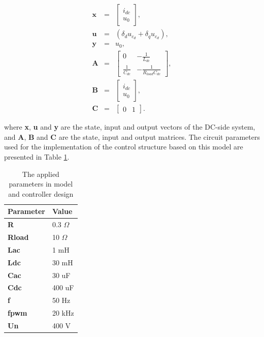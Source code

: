     \begin{equation}
        \begin{array}{rcl}
            \textbf{x}&=&\begin{bmatrix}
                i_{dc}\\
                u_0
            \end{bmatrix},\\
            \textbf{u}&=&(\delta_d u_{c_d}+\delta_q u_{c_d}),\\
            \textbf{y}&=&u_0,\\
            \textbf{A}&=&\begin{bmatrix}
                0&  -\frac{1}{L_{dc}}\\
                \frac{1}{C_{dc}}&   -\frac{1}{R_{load}C_{dc}}
            \end{bmatrix},\\
            \textbf{B}&=&\begin{bmatrix}
                i_{dc}\\
                u_0
            \end{bmatrix},\\
            \textbf{C}&=&\begin{bmatrix}0 &1\end{bmatrix}.
        \end{array}
        \label{EMPC:equ:mtx_ctrl}
    \end{equation}

    where \textbf{x}, \textbf{u} and \textbf{y} are the state, input and output vectors of the DC-side system, and \textbf{A}, \textbf{B} and \textbf{C} are the state, input and output matrices.
    The circuit parameters used for the implementation of the control structure based on this model are presented in Table \ref{EMPC:tbl:params}.

    \begin{table}[]
    \center
		\caption{The applied parameters in model and controller design}
        \begin{tabular}{|l|l|}
        \hline
        Parameter      & Value  \\ \hline
        \textbf{R}     & 0.3 $\Omega$ \\ \hline
        \textbf{Rload} & 10 $\Omega$  \\ \hline
        \textbf{Lac}   & 1 mH    \\ \hline
        \textbf{Ldc}   & 30 mH   \\ \hline
        \textbf{Cac}   & 30 uF   \\ \hline
        \textbf{Cdc}   & 400 uF  \\ \hline
        \textbf{f}     & 50 Hz   \\ \hline
        \textbf{fpwm}  & 20 kHz  \\ \hline
        \textbf{Un}    & 400 V   \\ \hline
        \end{tabular}
        \label{EMPC:tbl:params}
    \end{table}

